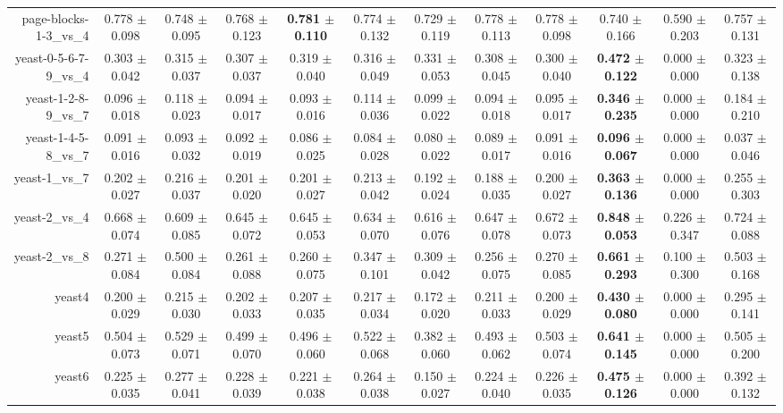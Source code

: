 \begin{table}[!ht]
{\begin{tabular}{r c c c c c c c c c c c}
page-blocks-1-3\_vs\_4 & 0.778 $\pm$ 0.098 & 0.748 $\pm$ 0.095 & 0.768 $\pm$ 0.123 & \textbf{0.781 $\pm$ 0.110} & 0.774 $\pm$ 0.132 & 0.729 $\pm$ 0.119 & 0.778 $\pm$ 0.113 & 0.778 $\pm$ 0.098 & 0.740 $\pm$ 0.166 & 0.590 $\pm$ 0.203 & 0.757 $\pm$ 0.131 \\
yeast-0-5-6-7-9\_vs\_4 & 0.303 $\pm$ 0.042 & 0.315 $\pm$ 0.037 & 0.307 $\pm$ 0.037 & 0.319 $\pm$ 0.040 & 0.316 $\pm$ 0.049 & 0.331 $\pm$ 0.053 & 0.308 $\pm$ 0.045 & 0.300 $\pm$ 0.040 & \textbf{0.472 $\pm$ 0.122} & 0.000 $\pm$ 0.000 & 0.323 $\pm$ 0.138 \\
yeast-1-2-8-9\_vs\_7 & 0.096 $\pm$ 0.018 & 0.118 $\pm$ 0.023 & 0.094 $\pm$ 0.017 & 0.093 $\pm$ 0.016 & 0.114 $\pm$ 0.036 & 0.099 $\pm$ 0.022 & 0.094 $\pm$ 0.018 & 0.095 $\pm$ 0.017 & \textbf{0.346 $\pm$ 0.235} & 0.000 $\pm$ 0.000 & 0.184 $\pm$ 0.210 \\
yeast-1-4-5-8\_vs\_7 & 0.091 $\pm$ 0.016 & 0.093 $\pm$ 0.032 & 0.092 $\pm$ 0.019 & 0.086 $\pm$ 0.025 & 0.084 $\pm$ 0.028 & 0.080 $\pm$ 0.022 & 0.089 $\pm$ 0.017 & 0.091 $\pm$ 0.016 & \textbf{0.096 $\pm$ 0.067} & 0.000 $\pm$ 0.000 & 0.037 $\pm$ 0.046 \\
yeast-1\_vs\_7 & 0.202 $\pm$ 0.027 & 0.216 $\pm$ 0.037 & 0.201 $\pm$ 0.020 & 0.201 $\pm$ 0.027 & 0.213 $\pm$ 0.042 & 0.192 $\pm$ 0.024 & 0.188 $\pm$ 0.035 & 0.200 $\pm$ 0.027 & \textbf{0.363 $\pm$ 0.136} & 0.000 $\pm$ 0.000 & 0.255 $\pm$ 0.303 \\
yeast-2\_vs\_4 & 0.668 $\pm$ 0.074 & 0.609 $\pm$ 0.085 & 0.645 $\pm$ 0.072 & 0.645 $\pm$ 0.053 & 0.634 $\pm$ 0.070 & 0.616 $\pm$ 0.076 & 0.647 $\pm$ 0.078 & 0.672 $\pm$ 0.073 & \textbf{0.848 $\pm$ 0.053} & 0.226 $\pm$ 0.347 & 0.724 $\pm$ 0.088 \\
yeast-2\_vs\_8 & 0.271 $\pm$ 0.084 & 0.500 $\pm$ 0.084 & 0.261 $\pm$ 0.088 & 0.260 $\pm$ 0.075 & 0.347 $\pm$ 0.101 & 0.309 $\pm$ 0.042 & 0.256 $\pm$ 0.075 & 0.270 $\pm$ 0.085 & \textbf{0.661 $\pm$ 0.293} & 0.100 $\pm$ 0.300 & 0.503 $\pm$ 0.168 \\
yeast4 & 0.200 $\pm$ 0.029 & 0.215 $\pm$ 0.030 & 0.202 $\pm$ 0.033 & 0.207 $\pm$ 0.035 & 0.217 $\pm$ 0.034 & 0.172 $\pm$ 0.020 & 0.211 $\pm$ 0.033 & 0.200 $\pm$ 0.029 & \textbf{0.430 $\pm$ 0.080} & 0.000 $\pm$ 0.000 & 0.295 $\pm$ 0.141 \\
yeast5 & 0.504 $\pm$ 0.073 & 0.529 $\pm$ 0.071 & 0.499 $\pm$ 0.070 & 0.496 $\pm$ 0.060 & 0.522 $\pm$ 0.068 & 0.382 $\pm$ 0.060 & 0.493 $\pm$ 0.062 & 0.503 $\pm$ 0.074 & \textbf{0.641 $\pm$ 0.145} & 0.000 $\pm$ 0.000 & 0.505 $\pm$ 0.200 \\
yeast6 & 0.225 $\pm$ 0.035 & 0.277 $\pm$ 0.041 & 0.228 $\pm$ 0.039 & 0.221 $\pm$ 0.038 & 0.264 $\pm$ 0.038 & 0.150 $\pm$ 0.027 & 0.224 $\pm$ 0.040 & 0.226 $\pm$ 0.035 & \textbf{0.475 $\pm$ 0.126} & 0.000 $\pm$ 0.000 & 0.392 $\pm$ 0.132 \\

\end{tabular}}
\end{table}

